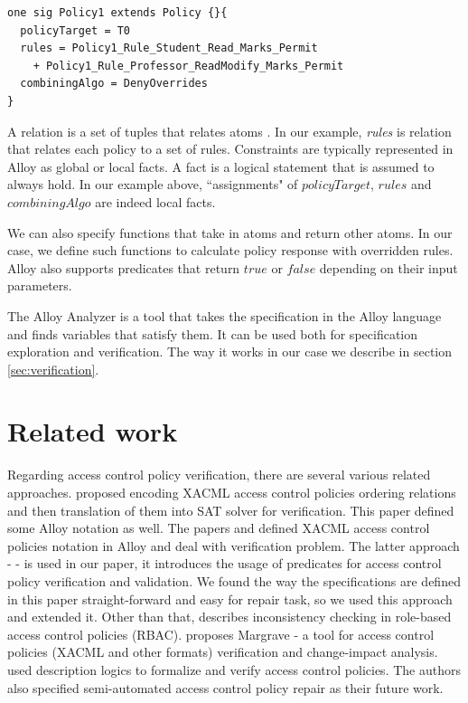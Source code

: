 \documentclass[letterpaper]{acm_proc_article-sp}
\begin{document}
\begin{verbatim}
one sig Policy1 extends Policy {}{
  policyTarget = T0
  rules = Policy1_Rule_Student_Read_Marks_Permit 
    + Policy1_Rule_Professor_ReadModify_Marks_Permit
  combiningAlgo = DenyOverrides
}
\end{verbatim}

A relation is a set of tuples that relates atoms \cite{jackson:alloy}. In our example, \textit{rules} is relation that relates each policy to a set of rules. Constraints are typically represented in Alloy as global or local facts. A fact is a logical statement that is assumed to always hold. In our example above, ``assignments" of $policyTarget$, $rules$ and $combiningAlgo$ are indeed local facts.

We can also specify functions that take in atoms and return other atoms. In our case, we define such functions to calculate policy response with overridden rules. Alloy also supports predicates that return $true$ or $false$ depending on their input parameters.

The Alloy Analyzer is a tool that takes the specification in the Alloy language and finds variables that satisfy them. It can be used both for specification exploration and verification. The way it works in our case we describe in section \ref{sec:verification}.

\section{Related work}

Regarding access control policy verification, there are several various related approaches.
\cite{Hughes:2008:AVA:1459278.1459282} proposed encoding XACML access control policies  ordering relations and then translation of them into SAT solver for verification. This paper defined some Alloy notation as well.  The papers \cite{acp:automated} and \cite{acp:alloy} defined XACML access control policies notation in Alloy and deal with verification problem. The latter approach - \cite{acp:alloy} - is used in our paper, it introduces the usage of predicates for access control policy verification and validation. We found the way the specifications are defined in this paper straight-forward and easy for repair task, so we used this approach and extended it. Other than that, \cite{4258517} describes inconsistency checking in role-based access control policies (RBAC). \cite{Fisler:2005:VCA:1062455.1062502} proposes Margrave - a tool for access control policies (XACML and other formats) verification and change-impact analysis. \cite {acp:descriptionlogics} used description logics to formalize and verify access control policies. The authors also specified semi-automated access control policy repair as their future work.
\end{document}
